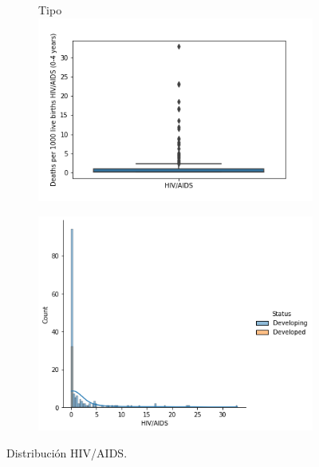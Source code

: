 \begin{itemize}
              
               \begin{figure}[H]
              \centering
              \begin{subfigure}{0.5\linewidth}
                \centering
               Tipo \includegraphics[width=\textwidth]{img/7.png}
              \end{subfigure}
              \hfill
                \begin{subfigure}{0.4\linewidth}
                \centering
                \includegraphics[width=\textwidth]{img/6.png}
              \end{subfigure}
               \caption{Distribución HIV/AIDS.}
               \label{fig: 4}
               
        \end{figure}
        

\end{itemize}
